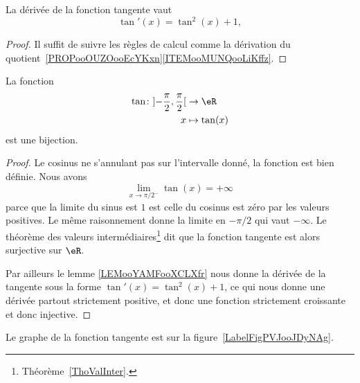 \begin{lemma}		\label{LEMooYAMFooXCLXfr}
	La dérivée de la fonction tangente vaut
	\begin{equation}
		\tan'(x)=\tan^2(x)+1,
	\end{equation}
\end{lemma}

\begin{proof}
	Il suffit de suivre les règles de calcul comme la dérivation du quotient~\ref{PROPooOUZOooEcYKxn}\ref{ITEMooMUNQooLiKffz}.
\end{proof}

\begin{proposition}
	La fonction
	\begin{equation}
		\begin{aligned}
			\tan\colon \mathopen] -\frac{ \pi }{ 2 } , \frac{ \pi }{2} \mathclose[ & \to \eR         \\
			x                                                                      & \mapsto \tan(x)
		\end{aligned}
	\end{equation}
	est une bijection.
\end{proposition}

\begin{proof}
	Le cosinus ne s'annulant pas sur l'intervalle donné, la fonction est bien définie. Nous avons
	\begin{equation}
		\lim_{x\to \pi/2^-} \tan(x)=+\infty
	\end{equation}
	parce que la limite du sinus est \( 1\) est celle du cosinus est zéro par les valeurs positives. Le même raisonnement donne la limite en \( -\pi/2\) qui vaut \( -\infty\). Le théorème des valeurs intermédiaires\footnote{Théorème~\ref{ThoValInter}.} dit que la fonction tangente est alors surjective sur \( \eR\).

	Par ailleurs le lemme \ref{LEMooYAMFooXCLXfr} nous donne la dérivée de la tangente sous la forme $\tan'(x)=\tan^2(x)+1$, ce qui nous donne une dérivée partout strictement positive, et donc une fonction strictement croissante et donc injective.
\end{proof}

Le graphe de la fonction tangente est sur la figure~\ref{LabelFigPVJooJDyNAg}. %
\newcommand{\CaptionFigPVJooJDyNAg}{Le graphe de la fonction tangente.}


